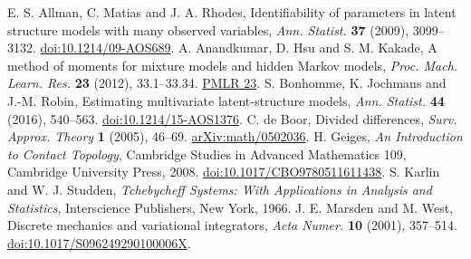 E. S. Allman, C. Matias and J. A. Rhodes,
Identifiability of parameters in latent structure models with many observed variables,
\emph{Ann. Statist.} \textbf{37} (2009), 3099--3132.
\href{https://doi.org/10.1214/09-AOS689}{doi:10.1214/09-AOS689}.
A. Anandkumar, D. Hsu and S. M. Kakade,
A method of moments for mixture models and hidden Markov models,
\emph{Proc. Mach. Learn. Res.} \textbf{23} (2012), 33.1--33.34.
\href{https://proceedings.mlr.press/v23/anandkumar12.html}{PMLR 23}.
S. Bonhomme, K. Jochmans and J.-M. Robin,
Estimating multivariate latent-structure models,
\emph{Ann. Statist.} \textbf{44} (2016), 540--563.
\href{https://doi.org/10.1214/15-AOS1376}{doi:10.1214/15-AOS1376}.
C. de Boor, Divided differences,
\emph{Surv. Approx. Theory} \textbf{1} (2005), 46--69.
\href{https://arxiv.org/abs/math/0502036}{arXiv:math/0502036}.
H. Geiges, \emph{An Introduction to Contact Topology},
Cambridge Studies in Advanced Mathematics 109, Cambridge University Press, 2008.
\href{https://doi.org/10.1017/CBO9780511611438}{doi:10.1017/CBO9780511611438}.
S. Karlin and W. J. Studden,
\emph{Tchebycheff Systems: With Applications in Analysis and Statistics},
Interscience Publishers, New York, 1966.
J. E. Marsden and M. West,
Discrete mechanics and variational integrators,
\emph{Acta Numer.} \textbf{10} (2001), 357--514.
\href{https://doi.org/10.1017/S096249290100006X}{doi:10.1017/S096249290100006X}.
